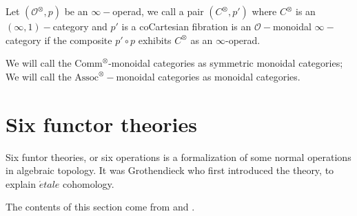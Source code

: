 \begin{definition}
    Let $(\mathcal{O}^\otimes,p)$ be an $\infty-$operad, we call a pair $(C^\otimes,p')$ where $C^\otimes$ is an $(\infty,1)-$category and $p'$ is a coCartesian fibration is an $\mathcal{O}-$monoidal $\infty-$category if the composite $p'\circ p$ exhibits $C^\otimes$ as an $\infty$-operad.
\end{definition}

\begin{remark}
    We will call the $\text{Comm}^\otimes$-monoidal categories as symmetric monoidal categories; We will call the $\text{Assoc}^\otimes-$monoidal categories as monoidal categories.
\end{remark}



\section{Six functor theories}

Six funtor theories, or six operations is a formalization of some normal operations in algebraic topology. It was Grothendieck who first introduced the theory, to explain $\acute{e}tale$ cohomology.

The contents of this section come from \textcite{ScholzeSF} and \textcite{HeyerMann2024}.

